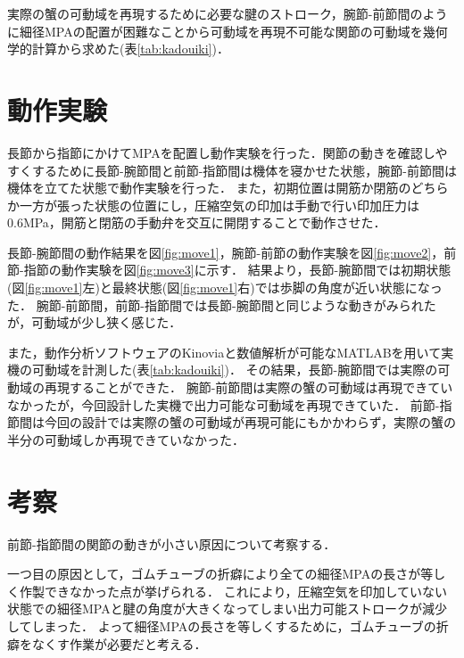 \documentclass{jarticle}
\begin{document}
実際の蟹の可動域を再現するために必要な腱のストローク，腕節-前節間のように細径MPAの配置が困難なことから可動域を再現不可能な関節の可動域を幾何学的計算から求めた(表\ref{tab:kadouiki})．
\vspace*{-2mm}
\section{動作実験}

長節から指節にかけてMPAを配置し動作実験を行った．関節の動きを確認しやすくするために長節-腕節間と前節-指節間は機体を寝かせた状態，腕節-前節間は機体を立てた状態で動作実験を行った．
また，初期位置は開筋か閉筋のどちらか一方が張った状態の位置にし，圧縮空気の印加は手動で行い印加圧力は0.6MPa，開筋と閉筋の手動弁を交互に開閉することで動作させた．

長節-腕節間の動作結果を図\ref{fig:move1}，腕節-前節の動作実験を図\ref{fig:move2}，前節-指節の動作実験を図\ref{fig:move3}に示す．
結果より，長節-腕節間では初期状態(図\ref{fig:move1}左)と最終状態(図\ref{fig:move1}右)では歩脚の角度が近い状態になった．
腕節-前節間，前節-指節間では長節-腕節間と同じような動きがみられたが，可動域が少し狭く感じた．

また，動作分析ソフトウェアのKinoviaと数値解析が可能なMATLABを用いて実機の可動域を計測した(表\ref{tab:kadouiki})．
その結果，長節-腕節間では実際の可動域の再現することができた．
腕節-前節間は実際の蟹の可動域は再現できていなかったが，今回設計した実機で出力可能な可動域を再現できていた．
前節-指節間は今回の設計では実際の蟹の可動域が再現可能にもかかわらず，実際の蟹の半分の可動域しか再現できていなかった．
\vspace*{-2mm}
\section{考察}

前節-指節間の関節の動きが小さい原因について考察する．

一つ目の原因として，ゴムチューブの折癖により全ての細径MPAの長さが等しく作製できなかった点が挙げられる．
これにより，圧縮空気を印加していない状態での細径MPAと腱の角度が大きくなってしまい出力可能ストロークが減少してしまった．
よって細径MPAの長さを等しくするために，ゴムチューブの折癖をなくす作業が必要だと考える．
\end{document}

